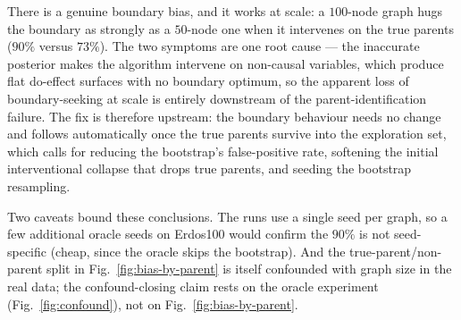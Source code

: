 There is a genuine boundary bias, and it works at scale: a $100$-node graph hugs the boundary as strongly as a $50$-node one when it intervenes on the true parents ($90\%$ versus $73\%$). The two symptoms are one root cause --- the inaccurate posterior makes the algorithm intervene on non-causal variables, which produce flat do-effect surfaces with no boundary optimum, so the apparent loss of boundary-seeking at scale is entirely downstream of the parent-identification failure. The fix is therefore upstream: the boundary behaviour needs no change and follows automatically once the true parents survive into the exploration set, which calls for reducing the bootstrap's false-positive rate, softening the initial interventional collapse that drops true parents, and seeding the bootstrap resampling.

Two caveats bound these conclusions. The runs use a single seed per graph, so a few additional oracle seeds on Erdos100 would confirm the $90\%$ is not seed-specific (cheap, since the oracle skips the bootstrap). And the true-parent/non-parent split in Fig.~\ref{fig:bias-by-parent} is itself confounded with graph size in the real data; the confound-closing claim rests on the oracle experiment (Fig.~\ref{fig:confound}), not on Fig.~\ref{fig:bias-by-parent}.
